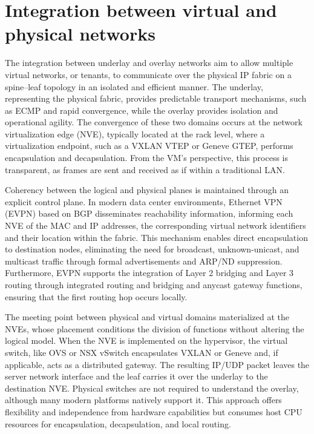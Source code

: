 \section{Integration between virtual and physical networks}

The integration between underlay and overlay networks aim to allow multiple virtual networks, or tenants, to communicate over the physical IP fabric on a spine–leaf topology in an isolated and efficient manner. The underlay, representing the physical fabric, provides predictable transport mechanisms, such as ECMP and rapid convergence, while the overlay provides isolation and operational agility. The convergence of these two domains occurs at the network virtualization edge (NVE), typically located at the rack level, where a virtualization endpoint, such as a VXLAN VTEP or Geneve GTEP, performs encapsulation and decapsulation. From the VM's perspective, this process is transparent, as frames are sent and received as if within a traditional LAN.

Coherency between the logical and physical planes is maintained through an explicit control plane. In modern data center environments, Ethernet VPN (EVPN) based on BGP disseminates reachability information, informing each NVE of the MAC and IP addresses, the corresponding virtual network identifiers and their location within the fabric. This mechanism enables direct encapsulation to destination nodes, eliminating the need for broadcast, unknown-unicast, and multicast traffic through formal advertisements and ARP/ND suppression. Furthermore, EVPN supports the integration of Layer 2 bridging and Layer 3 routing through integrated routing and bridging and anycast gateway functions, ensuring that the first routing hop occurs locally.

The meeting point between physical and virtual domains materialized at the NVEs, whose placement conditions the division of functions without altering the logical model. When the NVE is implemented on the hypervisor, the virtual switch, like OVS or NSX vSwitch encapsulates VXLAN or Geneve and, if applicable, acts as a distributed gateway. The resulting IP/UDP packet leaves the server network interface and the leaf carries it over the underlay to the destination NVE. Physical switches are not required to understand the overlay, although many modern platforms natively support it. This approach offers flexibility and independence from hardware capabilities but consumes host CPU resources for encapsulation, decapsulation, and local routing.

